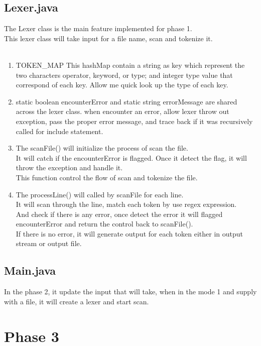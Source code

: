 \documentclass{article}
\begin{document}
    \subsection{Lexer.java}
    The Lexer class is the main feature implemented for phase 1.\\
    This lexer class will take input for a file name, scan and tokenize it.\\ \\
    \begin{enumerate}
        \item TOKEN\_MAP This hashMap contain a string as key which represent the
        two characters operator, keyword, or type; and integer type value that correspond of each key.
        Allow me quick look up the type of each key.
        \item static boolean encounterError and static string errorMessage are shared across the lexer class.
        when encounter an error, allow lexer throw out exception, pass the proper error message, and trace back if it was recursively called
        for include statement.
        \item The scanFile() will initialize the process of scan the file.
        \\It will catch if the encounterError is flagged. Once it detect the flag,
        it will throw the exception and handle it.\\
        This function control the flow of scan and tokenize the file.
        \item The processLine() will called by scanFile for each line.\\
        It will scan through the line, match each token by use regex expression.\\
        And check if there is any error, once detect the error it will flagged encounterError and return the control back to scanFile().\\
        If there is no error, it will generate output for each token either in output stream or output file.
    \end{enumerate}
    \subsection{Main.java}
    In the phase 2, it update the input that will take, when in the mode 1 and supply with a file, it will create a lexer and start scan.

    \section{Phase 3}
\end{document}
